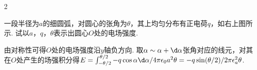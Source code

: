 \begin{paracol}{2}
\begin{problem}
    一段半径为$a$的细圆弧，对圆心的张角为$\theta$，其上均匀分布有正电荷$q$，如右上图所示. 试以$a$，$q$，$\theta$表示出圆心$O$处的电场强度.
    \switchcolumn\vspace*{\fill}\centering
    \vspace*{\fill}
\end{problem}\switchcolumn
{}
\begin{solution}
    由对称性可得$O$处的电场强度沿$y$轴负方向. 取$\alpha\sim\alpha+\d\alpha$张角对应的线元，对其在$O$处产生的场强积分得$E=\int_{-\theta/2}^{\theta/2}-q\cos\alpha\d\alpha/4\pi\epsilon_0a^2\theta=-q\sin(\theta/2)/2\pi\epsilon_a^2\theta$.
\end{solution}
\end{paracol}